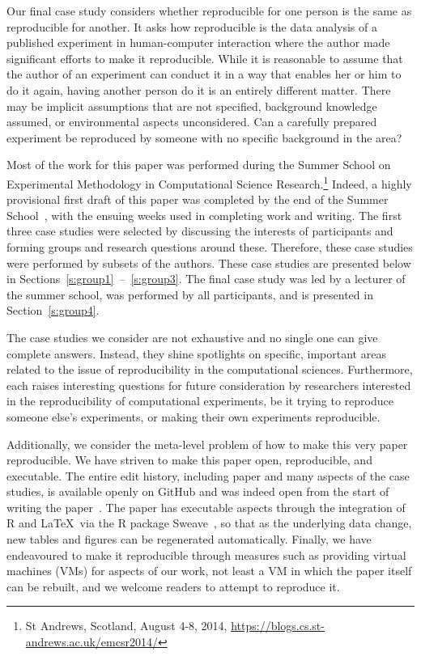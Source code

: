 Our final case study considers whether reproducible for one person is the same
as reproducible for another. It asks how reproducible is the data analysis of a
published experiment in human-computer interaction where the author made
significant efforts to make it reproducible. While it is reasonable to assume
that the author of an experiment can conduct it in a way that enables her or him
to do it again, having another person do it is an entirely different matter.
There may be implicit assumptions that are not specified, background knowledge
assumed, or environmental aspects unconsidered. Can a carefully prepared
experiment be reproduced by someone with no specific background in the area?

Most of the work for this paper was performed during the Summer School on
Experimental Methodology in Computational Science Research.\footnote{St
Andrews, Scotland, August 4-8, 2014,
\url{https://blogs.cs.st-andrews.ac.uk/emcsr2014/}}
Indeed, a highly
provisional first draft of this paper was completed by the end of the Summer
School~\cite{emcsr_arxiv_draft}, with the ensuing weeks used in completing work and writing.  
The first three case studies
were selected by discussing the interests of participants and forming groups
and research questions around these. Therefore, these case studies were
performed by subsets of the authors. These case studies are
presented below in Sections~\ref{s:group1}~--~\ref{s:group3}. The final case
study was led by a lecturer of the summer school, was performed by all
participants, and is presented in Section~\ref{s:group4}.

The case studies we consider are not exhaustive and no single one can give
complete answers. Instead, they shine spotlights on specific, important areas
related to the issue of reproducibility in the computational sciences. Furthermore,
each raises interesting questions for future consideration by researchers
interested in the reproducibility of computational experiments, be it trying to
reproduce someone else's experiments, or making their own experiments
reproducible.

Additionally, we consider the meta-level problem of how to make this very paper
reproducible. We have striven to make this paper open, reproducible, and
executable.
The entire edit history, including paper and many aspects of the
case studies, is available openly on
GitHub
and was indeed open from the start
of writing the paper~\cite{summerschoolpaper}.
The paper has executable aspects through the integration of R
and \LaTeX\ via the R package Sweave~\cite{lmucs-papers:Leisch:2002}, so that as the underlying
data change, new tables and figures can be regenerated automatically. Finally,
we have endeavoured to make it reproducible through measures such as providing
virtual machines (VMs) for aspects of our work, not least a VM in which
the paper itself can be rebuilt, and we welcome readers to attempt to
reproduce it.
